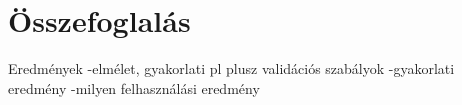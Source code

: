 \chapter{Összefoglalás}\label{sect:Summary}

Eredmények -elmélet, gyakorlati pl plusz validációs szabályok
           -gyakorlati eredmény 
           -milyen felhasználási eredmény